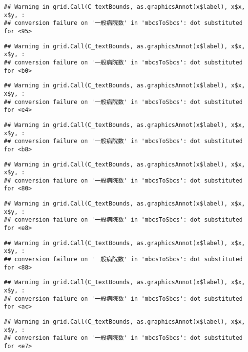 \documentclass[
]{article}
\begin{document}
\begin{verbatim}
## Warning in grid.Call(C_textBounds, as.graphicsAnnot(x$label), x$x, x$y, :
## conversion failure on '一般病院数' in 'mbcsToSbcs': dot substituted for <95>
\end{verbatim}

\begin{verbatim}
## Warning in grid.Call(C_textBounds, as.graphicsAnnot(x$label), x$x, x$y, :
## conversion failure on '一般病院数' in 'mbcsToSbcs': dot substituted for <b0>
\end{verbatim}

\begin{verbatim}
## Warning in grid.Call(C_textBounds, as.graphicsAnnot(x$label), x$x, x$y, :
## conversion failure on '一般病院数' in 'mbcsToSbcs': dot substituted for <e4>
\end{verbatim}

\begin{verbatim}
## Warning in grid.Call(C_textBounds, as.graphicsAnnot(x$label), x$x, x$y, :
## conversion failure on '一般病院数' in 'mbcsToSbcs': dot substituted for <b8>
\end{verbatim}

\begin{verbatim}
## Warning in grid.Call(C_textBounds, as.graphicsAnnot(x$label), x$x, x$y, :
## conversion failure on '一般病院数' in 'mbcsToSbcs': dot substituted for <80>
\end{verbatim}

\begin{verbatim}
## Warning in grid.Call(C_textBounds, as.graphicsAnnot(x$label), x$x, x$y, :
## conversion failure on '一般病院数' in 'mbcsToSbcs': dot substituted for <e8>
\end{verbatim}

\begin{verbatim}
## Warning in grid.Call(C_textBounds, as.graphicsAnnot(x$label), x$x, x$y, :
## conversion failure on '一般病院数' in 'mbcsToSbcs': dot substituted for <88>
\end{verbatim}

\begin{verbatim}
## Warning in grid.Call(C_textBounds, as.graphicsAnnot(x$label), x$x, x$y, :
## conversion failure on '一般病院数' in 'mbcsToSbcs': dot substituted for <ac>
\end{verbatim}

\begin{verbatim}
## Warning in grid.Call(C_textBounds, as.graphicsAnnot(x$label), x$x, x$y, :
## conversion failure on '一般病院数' in 'mbcsToSbcs': dot substituted for <e7>
\end{verbatim}
\end{document}
